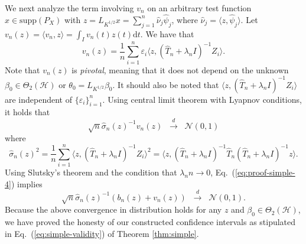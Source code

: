 \documentclass[11pt,a4paper]{article}
\renewcommand{\hat}{\widehat}
\theoremstyle{definition}
\theoremstyle{plain}
\theoremstyle{remark}
\newcommand{\supp}{\mathrm{supp}}
\newcommand{\ud}{\mathrm d}
\newcommand{\mH}{\mathcal H}
\begin{document}
We next analyze the term involving $v_n$ on an arbitrary test function $x\in\supp(P_X)$ with $z=L_{K^{1/2}}x=\sum_{j=1}^n\hat\nu_j\hat\psi_j$, where $\hat\nu_j=\langle z,\hat\psi_j\rangle$.
Let $v_n(z)=\langle v_n,z\rangle = \int_I v_n(t)z(t)\ud t$. We have that
$$
v_n(z) = \frac{1}{n}\sum_{i=1}^n \varepsilon_i \langle z, (\hat T_n+\lambda_n I)^{-1}Z_i\rangle.
$$
Note that $v_n(z)$ is \emph{pivotal}, meaning that it does not depend on the unknown $\beta_0\in\Theta_2(\mH)$ or $\theta_0=L_{K^{1/2}}\beta_0$.
It should also be noted that $\langle z,(\hat T_n+\lambda_n I)^{-1}Z_i\rangle$ are independent of $\{\varepsilon_i\}_{i=1}^n$.
{\color{red}Using central limit theorem with Lyapnov conditions}, it holds that 
\begin{equation}
\sqrt{n}\hat\sigma_n(z)^{-1}v_n(z) \;\;\overset{d}{\to}\;\; \mathcal N(0,1)
\label{eq:proof-simple-4}
\end{equation}
where
$$
\hat\sigma_n(z)^2 = \frac{1}{n}\sum_{i=1}^n \langle z,(\hat T_n+\lambda_n I)^{-1}Z_i\rangle^2 = \langle z, (\hat T_n+\lambda_n I)^{-1}\hat T_n(\hat T_n+\lambda_n I)^{-1} z\rangle.
$$
Using Slutsky's theorem and the condition that $\lambda_n n\to 0$, Eq.~(\ref{eq:proof-simple-4}) implies
$$
\sqrt{n}\hat\sigma_n(z)^{-1}\left(b_n(z)+v_n(z)\right)\;\;\overset{d}{\to}\;\;\mathcal N(0,1).
$$
Because the above convergence in distribution holds for any $z$ and $\beta_0\in\Theta_2(\mH)$, we have proved the honesty of our constructed confidence intervals as stipulated in Eq.~(\ref{eq:simple-validity}) of Theorem \ref{thm:simple}.



\end{document}
